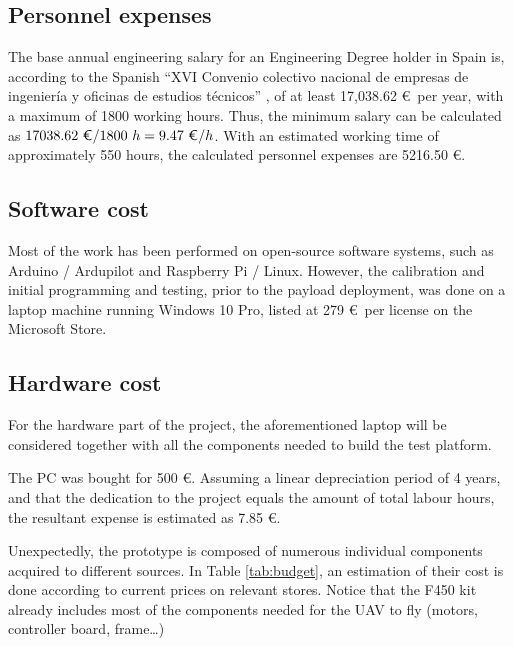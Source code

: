 \subsection{Personnel expenses}
The base annual engineering salary for an Engineering Degree holder in Spain is, according to the Spanish ``XVI Convenio colectivo nacional de empresas de ingenier\'ia y oficinas de estudios t\'ecnicos'' \cite{disposicin16097deboenm274de20112011}, of at least 17,038.62 \euro\ per year, with a maximum of 1800 working hours.
Thus, the minimum salary can be calculated as $17038.62\ \text{\euro} / 1800\ h = 9.47\ \text{\euro}/h $. With an estimated working time of approximately 550 hours, the calculated personnel expenses are 5216.50 \euro.

\subsection{Software cost}
Most of the work has been performed on open-source software systems, such as Arduino / Ardupilot and Raspberry Pi / Linux.
However, the calibration and initial programming and testing, prior to the payload deployment, was done on a laptop machine running Windows 10 Pro, listed at 279 \euro\ per license on the Microsoft Store.

\subsection{Hardware cost}
For the hardware part of the project, the aforementioned laptop will be considered together with all the components needed to build the test platform.

The PC was bought for 500 \euro. Assuming a linear depreciation period of 4 years, and that the dedication to the project equals the amount of total labour hours, the resultant expense is estimated as 7.85 \euro.

Unexpectedly, the prototype is composed of numerous individual components acquired to different sources.
In Table \ref{tab:budget}, an estimation of their cost is done according to current prices on relevant stores.
Notice that the F450 kit already includes most of the components needed for the UAV to fly (motors, controller board, frame\ldots)

